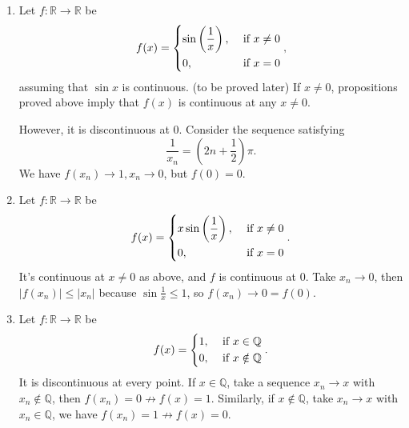 \begin{example}
    \leavevmode
    \begin{enumerate}
        \item Let \(f: \mathbb{R}\to \mathbb{R}\) be
        \[
            f(x) = \begin{dcases}
                \sin \left(\frac{1}{x}\right), &\text{ if } x\neq 0\\
                0, &\text{ if } x = 0\\
            \end{dcases},
        \]
        assuming that \(\sin x\) is continuous. (to be proved later) If \(x\neq 0\), propositions proved above imply that \(f(x)\) is continuous at any \(x \neq 0\).

        However, it is discontinuous at \(0\). Consider the sequence satisfying
        \[\frac{1}{x_n} = (2n + \frac{1}{2})\pi.\]
        We have \(f(x_n) \to 1, x_n \to 0\), but \(f(0)= 0\).
        \item Let \(f: \mathbb{R}\to \mathbb{R}\) be
        \[
            f(x) = \begin{dcases}
                x \sin\left(\frac{1}{x}\right), &\text{ if } x\neq 0\\
                0, &\text{ if } x = 0\\
            \end{dcases}.
        \]
        It's continuous at \(x\neq 0\) as above, and \(f\) is continuous at \(0\). Take \(x_n \to 0\), then \(\left\vert f(x_n) \right\vert \leq \left\vert x_n \right\vert \) because \(\sin \frac{1}{x} \leq 1\), so \(f(x_n) \to 0 = f(0)\).
        \item Let \(f: \mathbb{R}\to \mathbb{R}\) be
        \[
            f(x) = \begin{dcases}
                1, &\text{ if } x \in \mathbb{Q}\\
                0, &\text{ if } x \notin \mathbb{Q}\\
            \end{dcases}.
        \]
        It is discontinuous at every point. If \(x \in \mathbb{Q}\), take a sequence \(x_n \to x\) with \(x_n \notin \mathbb{Q}\), then \(f(x_n) = 0 \not \to f(x) = 1\). Similarly, if \(x \notin \mathbb{Q}\), take \(x_n \to x\) with \(x_n \in \mathbb{Q}\), we have \(f(x_n) = 1 \not \to f(x) = 0\).
    \end{enumerate}
\end{example}